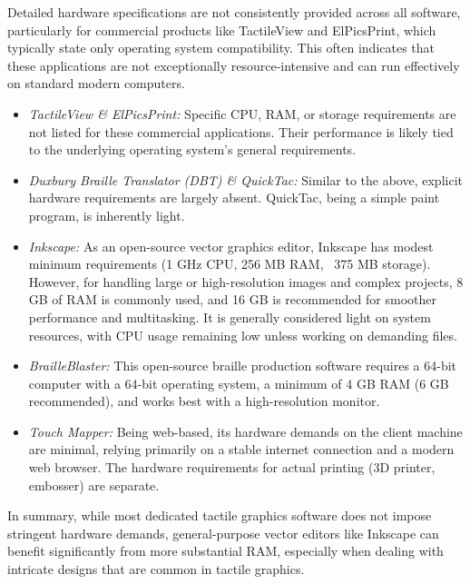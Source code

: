 Detailed hardware specifications are not consistently provided across all software, particularly for commercial products like TactileView and ElPicsPrint, which typically state only operating system compatibility. This often indicates that these applications are not exceptionally resource-intensive and can run effectively on standard modern computers.

\begin{itemize}
    \item \emph{TactileView \& ElPicsPrint:} Specific CPU, RAM, or storage requirements are not listed for these commercial applications.\cite{DuxburyDBTDetails,IrieTactileView,BlindSVG,DuxburyNews} Their performance is likely tied to the underlying operating system's general requirements.
    \item \emph{Duxbury Braille Translator (DBT) \& QuickTac:} Similar to the above, explicit hardware requirements are largely absent.\cite{PerkinsTouchMapper,ViewplusTSS,IrieBrailleTrac,ElitaElPicsPrint,DuxburyProducts,ElitaManual} QuickTac, being a simple paint program, is inherently light.\cite{DuxburyDBTDetails}
    \item \emph{Inkscape:} As an open-source vector graphics editor, Inkscape has modest minimum requirements (1 GHz CPU, 256 MB RAM, ~375 MB storage).\cite{BlindHelpDBT} However, for handling large or high-resolution images and complex projects, 8 GB of RAM is commonly used, and 16 GB is recommended for smoother performance and multitasking.\cite{BlindHelpDBT} It is generally considered light on system resources, with CPU usage remaining low unless working on demanding files.\cite{BlindHelpDBT}
    \item \emph{BrailleBlaster:} This open-source braille production software requires a 64-bit computer with a 64-bit operating system, a minimum of 4 GB RAM (6 GB recommended), and works best with a high-resolution monitor.\cite{SterlingAdaptivesVP}
    \item \emph{Touch Mapper:} Being web-based, its hardware demands on the client machine are minimal, relying primarily on a stable internet connection and a modern web browser.\cite{AELData,NYUWorkflow,Ability2AccessTSS} The hardware requirements for actual printing (3D printer, embosser) are separate.
\end{itemize}

In summary, while most dedicated tactile graphics software does not impose stringent hardware demands, general-purpose vector editors like Inkscape can benefit significantly from more substantial RAM, especially when dealing with intricate designs that are common in tactile graphics.

